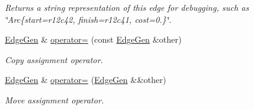 \begin{DoxyCompactItemize}
\begin{DoxyCompactList}\small\item\em Returns a string representation of this edge for debugging, such as \char`\"{}\+Arc\{start=r12c42, finish=r12c41, cost=0.\}\char`\"{}. \end{DoxyCompactList}\item 
\mbox{\hyperlink{classEdgeGen}{Edge\+Gen}} \& \mbox{\hyperlink{classEdgeGen_adfd141be3aba2f0fec6a502db1476607}{operator=}} (const \mbox{\hyperlink{classEdgeGen}{Edge\+Gen}} \&other)
\begin{DoxyCompactList}\small\item\em Copy assignment operator. \end{DoxyCompactList}\item 
\mbox{\hyperlink{classEdgeGen}{Edge\+Gen}} \& \mbox{\hyperlink{classEdgeGen_af076bdaa4ab4dea27638b940a0ff52af}{operator=}} (\mbox{\hyperlink{classEdgeGen}{Edge\+Gen}} \&\&other)
\begin{DoxyCompactList}\small\item\em Move assignment operator. \end{DoxyCompactList}\end{DoxyCompactItemize}
